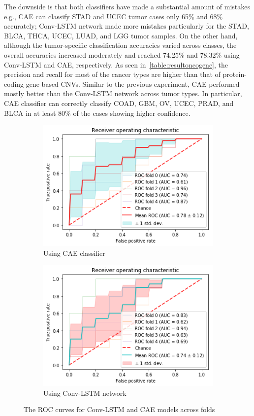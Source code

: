 \hspace*{3.5mm} The downside is that both classifiers have made a substantial amount of mistakes e.g., CAE can classify STAD and UCEC tumor cases only 65\% and 68\% accurately; Conv-LSTM network made more mistakes particularly for the STAD, BLCA, THCA, UCEC, LUAD, and LGG tumor samples. On the other hand, although the tumor-specific classification accuracies varied across classes, the overall accuracies increased moderately and reached 74.25\% and 78.32\% using Conv-LSTM and CAE, respectively. As seen in~\cref{table:resultoncogene}, the precision and recall for most of the cancer types are higher than that of protein-coding gene-based CNVs. Similar to the previous experiment, CAE performed mostly better than the Conv-LSTM network across tumor types. In particular, CAE classifier can correctly classify COAD, GBM, OV, UCEC, PRAD, and BLCA in at least 80\% of the cases showing higher confidence. 

\begin{figure}[h]
	\centering
	\begin{subfigure}{0.48\linewidth}
		\centering
		\includegraphics[scale=0.55]{images/download1.png}
		\caption{Using CAE classifier}
	\end{subfigure}
	\hspace{2mm}
	\begin{subfigure}{0.48\linewidth}
		\centering
		\includegraphics[scale=0.55]{images/download2.png}
		\caption{Using Conv-LSTM network}
	\end{subfigure}
	\caption{The ROC curves for Conv-LSTM and CAE models across folds} 
	\label{fig:roc}
	 \vspace{-2mm}
\end{figure}

